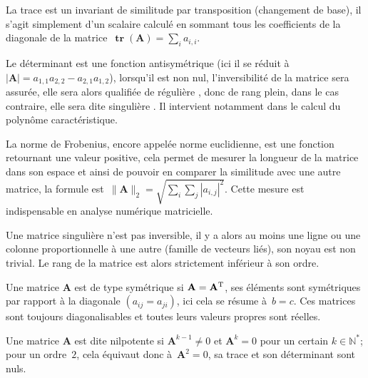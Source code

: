 \documentclass[11pt]{article}
\newcommand{\mb}[1]{\mathbf{#1}}
\DeclareMathOperator*{\ttra}{\mathrm{\mathbf{tr}}}
\begin{document}
\begin{description}[leftmargin=4cm, style=nextline]

\item[\texttt{trace()}] 
La trace est un invariant de similitude par transposition (changement de base), il s'agit simplement d'un scalaire calcul\'e en sommant tous les coefficients
de la diagonale de la matrice~$\ttra(\mb{A}) = \sum_{i}a_{i,i}$.\\

\item[\texttt{determinant()}] 
Le d\'eterminant est une fonction antisym\'etrique (ici il se r\'eduit \`a $|\mb{A}|=a_{1,1}a_{2,2}-a_{2,1}a_{1,2}$), lorsqu'il est non nul, l'inversibilit\'e de la matrice sera assur\'ee,
elle sera alors qualifi\'ee de \og r\'eguli\`ere \fg, donc de rang plein, dans le cas contraire, elle sera dite \og singuli\`ere \fg. Il intervient notamment dans le calcul du polynôme caractéristique.\\

\item[\texttt{norm()}] 
La norme de Frobenius, encore appel\'ee norme euclidienne, est une fonction retournant une valeur positive, cela permet de mesurer la longueur de la matrice dans
son espace et ainsi de pouvoir en comparer la similitude avec une autre matrice, la formule est~$\|\mb{A}\|_{2} = \sqrt{\sum_{i}\sum_{j} |a_{i,j}|^{2}}$. Cette mesure
est indispensable en analyse num\'erique matricielle.\\

\item[\texttt{is\_singular()}] 
Une matrice singulière n'est pas inversible, il y a alors au moins une ligne ou une colonne proportionnelle \`a une autre (famille de vecteurs li\'es), son noyau est non trivial.
Le rang de la matrice est alors strictement inf\'erieur \`a son ordre.\\

\item[\texttt{is\_symmetric()}] 
Une matrice $\mb{A}$ est de type sym\'etrique si $\mb{A} = \mb{A}^{\textsc{T}}$, ses \'el\'ements sont sym\'etriques par rapport \`a la diagonale $(a_{ij} = a_{ji})$, ici cela
se r\'esume \`a~$b=c$. Ces matrices sont toujours diagonalisables et toutes leurs valeurs propres sont r\'eelles.\\

\item[\texttt{is\_nilpotent()}] 
Une matrice $\mb{A}$ est dite nilpotente si $\mb{A}^{k-1} \neq 0$ et $\mb{A}^k = 0$ pour un certain $k \in \mathbb{N}^*$; pour un ordre~$2$, cela \'equivaut donc
\`a~$\mb{A}^2 = 0$, sa trace et son d\'eterminant sont nuls.\\


\end{description}
\end{document}
